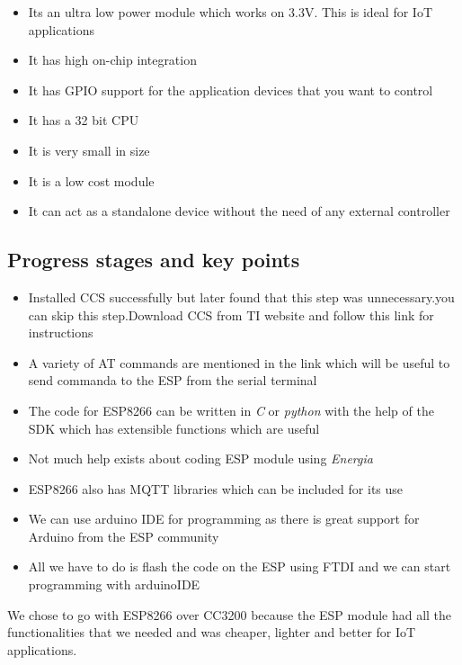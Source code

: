 \documentclass[16pt]{article}
\begin{document}
\begin{itemize}

\item
  Its an ultra low power module which works on 3.3V. This is ideal for
  IoT applications
\item
  It has high on-chip integration
\item
  It has GPIO support for the application devices that you want to
  control
\item
  It has a 32 bit CPU
\item
  It is very small in size
\item
  It is a low cost module
\item
  It can act as a standalone device without the need of any external
  controller
\end{itemize}

\subsection{Progress stages and key points}

\begin{itemize}

\item
  Installed CCS successfully but later found that this step was unnecessary.you can skip this step.Download CCS from TI website and follow this link for instructions
\item
  A variety of AT commands are mentioned in the link which will be
  useful to send commanda to the ESP from the serial terminal
\item
  The code for ESP8266 can be written in \emph{C} or \emph{python} with
  the help of the SDK which has extensible functions which are useful
\item
  Not much help exists about coding ESP module using \emph{Energia}
\item
  ESP8266 also has MQTT libraries which can be included for its use
\item
  We can use arduino IDE for programming as there is great support for
  Arduino from the ESP community
\item
  All we have to do is flash the code on the ESP using FTDI and we can
  start programming with arduinoIDE
  
\end{itemize}

We chose to go with ESP8266 over CC3200 because the ESP module had all
the functionalities that we needed and was cheaper, lighter and better
for IoT applications.
\end{document}
